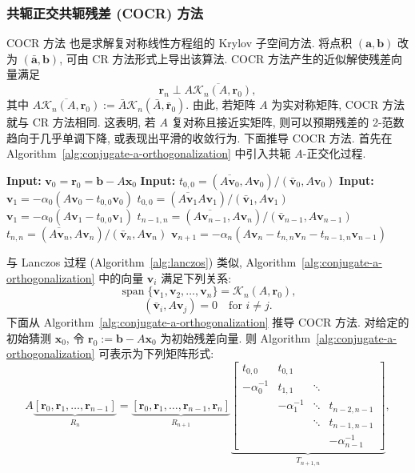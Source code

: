 \subsubsection{{共轭正交共轭残差 (COCR) 方法}}\label{subsec:cocr-method}
{COCR 方法  也是求解复对称线性方程组的 Krylov 子空间方法. 将点积 $(\bm a,\bm b)$ 改为 $(\bar{\bm a},\bm b)$, 可由 CR 方法形式上导出该算法. COCR 方法产生的近似解使残差向量满足}
\[\bm r_n\perp\overline{A\mathcal K_n(A,\bm r_0)},\]
{其中 $\overline{A\mathcal K_n(A,\bm r_0)}:=\bar A\mathcal K_n(\bar A,\bar{\bm r}_0)$. 由此, 若矩阵 $A$ 为实对称矩阵, COCR 方法就与 CR 方法相同. 这表明, 若 $A$ 复对称且接近实矩阵, 则可以预期残差的 2-范数趋向于几乎单调下降, 或表现出平滑的收敛行为. 下面推导 COCR 方法. 首先在 Algorithm\ \ref{alg:conjugate-a-orthogonalization} 中引入共轭 $A$-正交化过程.}
\begin{algorithm}[H]\caption{{不作归一化的共轭 $A$-正交化过程 (注意: $(\bar{\bm a},\bm b)=\bm a^{\top}\bm b$)}}\label{alg:conjugate-a-orthogonalization}\begin{algorithmic}[1]
\Statex\textbf{Input:} $\bm v_0=\bm r_0=\bm b-A\bm x_0$
\Statex\textbf{Input:} $t_{0,0}=(\overline{A\bm v_0},A\bm v_0)/(\bar{\bm v}_0,A\bm v_0)$
\Statex\textbf{Input:} $\bm v_1=-\alpha_0(A\bm v_0-t_{0,0}\bm v_0)$
\State $t_{0,0}=(\overline{A\bm v_1}A\bm v_1)/(\bar{\bm v}_1,A\bm v_1)$
\State $\bm v_1=-\alpha_0(A\bm v_1-t_{0,0}\bm v_1)$
\State $t_{n-1,n}=(\overline{A\bm v_{n-1}},A\bm v_n)/(\bar{\bm v}_{n-1},A\bm v_{n-1})$
\State $t_{n,n}=(\overline{A\bm v_n},A\bm v_n)/(\bar{\bm v}_n,A\bm v_n)$
\State $\bm v_{n+1}=-\alpha_n(A\bm v_n-t_{n,n}\bm v_n-t_{n-1,n}\bm v_{n-1})$
\EndFor\end{algorithmic}\end{algorithm}
{与 Lanczos 过程 (Algorithm\ \ref{alg:lanczos}) 类似, Algorithm\ \ref{alg:conjugate-a-orthogonalization} 中的向量 $\bm v_i$ 满足下列关系:}
\[\operatorname{span}\{\bm v_1,\bm v_2,\ldots,\bm v_n\}=\mathcal K_n(A,\bm r_0),\]
\begin{equation}\label{eq:cocr-a-orthogonality}(\bar{\bm v}_i,A\bm v_j)=0\quad\text{for }i\ne j.\end{equation}
{下面从 Algorithm\ \ref{alg:conjugate-a-orthogonalization} 推导 COCR 方法. 对给定的初始猜测 $\bm x_0$, 令 $\bm r_0:=\bm b-A\bm x_0$ 为初始残差向量. 则 Algorithm\ \ref{alg:conjugate-a-orthogonalization} 可表示为下列矩阵形式:}
\[A\underbrace{[\bm r_0,\bm r_1,\ldots,\bm r_{n-1}]}_{R_n}
=\underbrace{[\bm r_0,\bm r_1,\ldots,\bm r_{n-1},\bm r_n]}_{R_{n+1}}
\underbrace{\begin{bmatrix}t_{0,0}&t_{0,1}&&\\-\alpha_0^{-1}&t_{1,1}&\ddots&\\&-\alpha_1^{-1}&\ddots&t_{n-2,n-1}\\&&\ddots&t_{n-1,n-1}\\&&&-\alpha_{n-1}^{-1}\end{bmatrix}}_{T_{n+1,n}},\]
